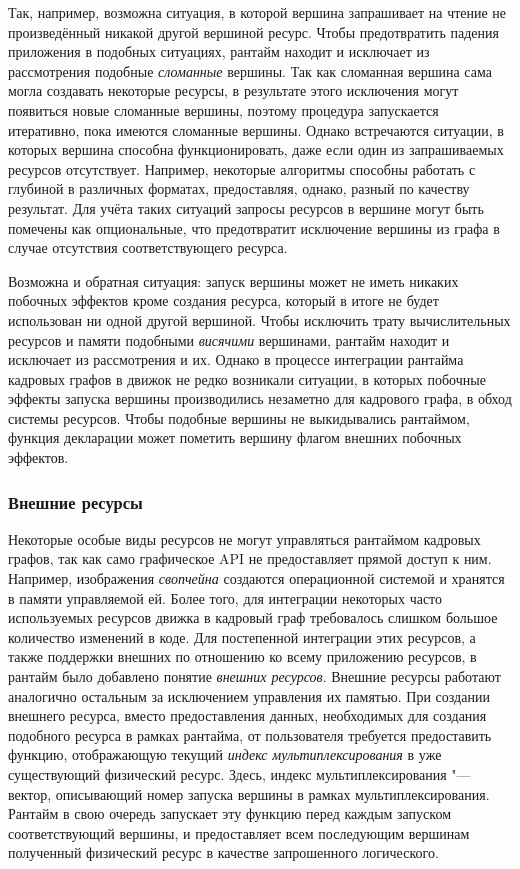 Так, например, возможна ситуация, в которой вершина запрашивает на чтение не произведённый никакой другой вершиной ресурс.
Чтобы предотвратить падения приложения в подобных ситуациях, рантайм находит и исключает из рассмотрения подобные \textit{сломанные} вершины.
Так как сломанная вершина сама могла создавать некоторые ресурсы, в результате этого исключения могут появиться новые сломанные вершины, поэтому процедура запускается итеративно, пока имеются сломанные вершины.
Однако встречаются ситуации, в которых вершина способна функционировать, даже если один из запрашиваемых ресурсов отсутствует.
Например, некоторые алгоритмы способны работать с глубиной в различных форматах, предоставляя, однако, разный по качеству результат.
Для учёта таких ситуаций запросы ресурсов в вершине могут быть помечены как опциональные, что предотвратит исключение вершины из графа в случае отсутствия соответствующего ресурса.

Возможна и обратная ситуация: запуск вершины может не иметь никаких побочных эффектов кроме создания ресурса, который в итоге не будет использован ни одной другой вершиной.
Чтобы исключить трату вычислительных ресурсов и памяти подобными \textit{висячими} вершинами, рантайм находит и исключает из рассмотрения и их.
Однако в процессе интеграции рантайма кадровых графов в движок не редко возникали ситуации, в которых побочные эффекты запуска вершины производились незаметно для кадрового графа, в обход системы ресурсов.
Чтобы подобные вершины не выкидывались рантаймом, функция декларации может пометить вершину флагом внешних побочных эффектов.

\subsubsection{Внешние ресурсы}
Некоторые особые виды ресурсов не могут управляться рантаймом кадровых графов, так как само графическое API не предоставляет прямой доступ к ним.
Например, изображения \textit{свопчейна} создаются операционной системой и хранятся в памяти управляемой ей.
Более того, для интеграции некоторых часто используемых ресурсов движка в кадровый граф требовалось слишком большое количество изменений в коде.
Для постепенной интеграции этих ресурсов, а также поддержки внешних по отношению ко всему приложению ресурсов, в рантайм было добавлено понятие \textit{внешних ресурсов}.
Внешние ресурсы работают аналогично остальным за исключением управления их памятью.
При создании внешнего ресурса, вместо предоставления данных, необходимых для создания подобного ресурса в рамках рантайма, от пользователя требуется предоставить функцию, отображающую текущий \textit{индекс мультиплексирования} в уже существующий физический ресурс.
Здесь, индекс мультиплексирования "--- вектор, описывающий номер запуска вершины в рамках мультиплексирования.
Рантайм в свою очередь запускает эту функцию перед каждым запуском соответствующий вершины, и предоставляет всем последующим вершинам полученный физический ресурс в качестве запрошенного логического.

